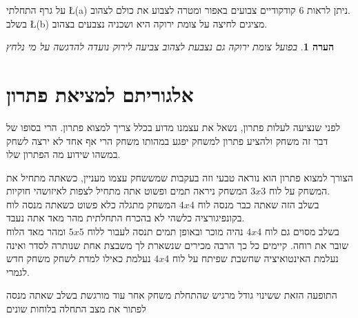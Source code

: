 \documentclass[12pt,twoside]{article}
\newtheorem{comm}{הערה}[section]
\begin{document}
על גרף התחלתי
\L{(a)}
ניתן לראות
$6$
קודקודיים
צבועים באפור ומטרה לצבוע את כולם לצהוב.
\\
בשלב 
\L{(b)}
מציגים  לחיצה על צומת ירוקה היא ושכניה נצבעים בצהוב.

\begin{comm}
    בפועל צומת ירוקה גם נצבעת לצהוב צביעה לירוק נועדה להדגשה על מי נלחץ
\end{comm}

\newpage

\section{ אלגוריתם למציאת פתרון}
לפני שנציעה לעלות פתרון, נשאל את עצמנו מדוע בכלל צריך למצוא פתרון.
הרי בסופו של דבר זה משחק ולהציע פתרון למשחק יפגע במהותו משחק הרי אף אחד לא ירצה
לשחק במשהו שידוע מה הפתרון שלו.

הצורך למצוא פתרון הוא נוראה טבעי וזה בעקבות שמששחק עצמו מעניין, כשאתה מתחיל 
את המשחק על לוח 
$3x3$
המשחק ניראה תמים ופשוט אתה מתחיל לצפות לאיזושהי חוקיות.
\\
בשלב הזה שאתה כבר מנסה לוח 
$4x4$
המשחק מתגלה כלא פשוט כשאתה מנסה לוח בקונפיגורציה כלשהי לא בהכרח התחלתית
מהר מאד אתה נעבד.
\\
בשלב מסוים גם לוח 
$4x4$
נהיה מוכר ובאופן תמים תנסה לעבור ללוח
$5x5$
ומהר מאד הלוח שובר את רוחה.
קיימים כל כך הרבה מכירים שנשארת לך משבצת אחת שנותרה לסדר ואינה נעלמת
האינטואיציה שחשבת שפיתח על לוח 
$4x4$
נעלמת כאילו למדת לשחק משחק חדש לגמרי.

התופעה הזאת ששינוי גודל מרגיש שהתחלת משחק אחר עוד
מורגשת בשלב שאתה מנסה לפתור את מצב התחלה בלוחות שונים
\end{document}
